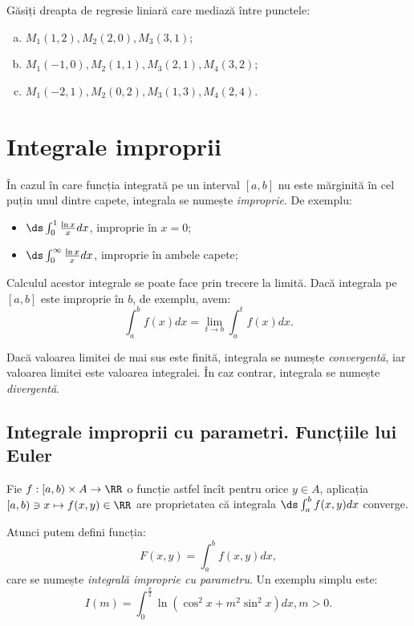 Găsiți dreapta de regresie liniară care mediază între punctele:
\begin{enumerate}[(a)]
\item $ M_1(1, 2), M_2(2, 0), M_3(3, 1) $;
\item $ M_1(-1, 0), M_2(1, 1), M_3(2, 1), M_4(3, 2) $;
\item $ M_1(-2, 1), M_2(0, 2), M_3(1, 3), M_4(2, 4) $.
\end{enumerate}


\section{Integrale improprii}
În cazul în care funcția integrată pe un interval $ [a, b] $ nu este mărginită
în cel puțin unul dintre capete, integrala se numește \emph{improprie}.
De exemplu:
\begin{itemize}
\item $ \ds\int_0^1 \frac{\ln x}{x} dx $, improprie în $ x = 0 $;
\item $ \ds\int_0^\infty \frac{\ln x}{x} dx $, improprie în ambele capete;
\end{itemize}

Calculul acestor integrale se poate face prin trecere la limită. Dacă integrala
pe $ [a, b] $ este improprie în $ b $, de exemplu, avem:
\[
  \int_a^b f(x) dx = \lim_{t \to b} \int_a^t f(x) dx.
\]

Dacă valoarea limitei de mai sus este finită, integrala se numește \emph{convergentă},
iar valoarea limitei este valoarea integralei. În caz contrar, integrala se
numește \emph{divergentă}.


\subsection{Integrale improprii cu parametri. Funcțiile lui Euler}
Fie $ f : [a, b) \times A \to \RR $ o funcție astfel încît pentru orice
$ y \in A $, aplicația $ [a, b) \ni x \mapsto f(x, y) \in \RR $ are
proprietatea că integrala $ \ds\int_a^b f(x, y) dx $ converge.

Atunci putem defini funcția:
\[
  F(x, y) = \int_a^b f(x, y) dx,
\]
care se numește \emph{integrală improprie cu parametru}. Un exemplu simplu este:
\[
  I(m) = \int_0^{\frac{\pi}{2}} \ln(\cos^2 x + m^2 \sin^2 x) dx, m > 0.
\]

